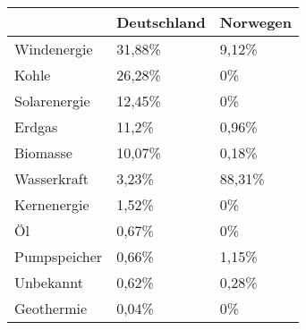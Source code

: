 \begin{tabular}{|p{5cm}|p{5cm}|p{5cm}|}
    \hline
    & Deutschland & Norwegen \\
    \hline
    \hline
    Windenergie & 31,88\% & 9,12\% \\
    \hline
    Kohle & 26,28\% & 0\% \\
    \hline
    Solarenergie & 12,45\% & 0\% \\
    \hline
    Erdgas & 11,2\% & 0,96\% \\
    \hline
    Biomasse & 10,07\% & 0,18\% \\
    \hline
    Wasserkraft & 3,23\% & 88,31\% \\
    \hline
    Kernenergie & 1,52\% & 0\% \\
    \hline
    Öl & 0,67\% & 0\% \\
    \hline
    Pumpspeicher & 0,66\% & 1,15\% \\
    \hline
    Unbekannt & 0,62\% & 0,28\% \\
    \hline
    Geothermie & 0,04\% & 0\% \\
    \hline
\end{tabular}
